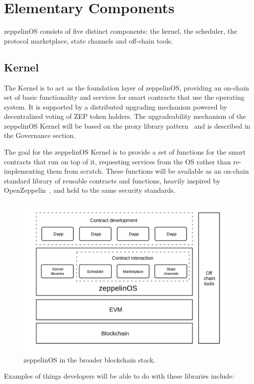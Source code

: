 \documentclass[]{article}
\makeatletter
\DeclareRobustCommand{\_}{%
  \leavevmode\vbox{%
    \hrule\@width.5em
          \@height-.26ex
          \@depth\dimexpr.26ex+.28pt\relax}}
\makeatother
\begin{document}
\section{Elementary Components}

zeppelinOS consists of five distinct components: the kernel, the
scheduler, the protocol marketplace, state channels and off-chain
tools.

\subsection{Kernel}

The Kernel is to act as the foundation layer of zeppelinOS, providing
an on-chain set of basic functionality and services for smart
contracts that use the operating system. It is supported by a distributed
upgrading mechanism powered by decentralized voting of ZEP token
holders. The upgradeability mechanism of the zeppelinOS Kernel will be
based on the proxy library pattern~\cite{proxylibs} and is described in
the Governance section.

The goal for the zeppelinOS Kernel is to provide a set of functions for
the smart contracts that run on top of it, requesting services from the
OS rather than re-implementing them from scratch. These functions will
be available as an on-chain standard library of reusable contracts and
functions, heavily inspired by OpenZeppelin~\cite{openzeppelin}, and held to the
same security standards.

\begin{figure}
  \centering
  \includegraphics[width=0.65\linewidth]{images/image6}
  \caption{zeppelinOS in the broader blockchain stack.}
\end{figure}

Examples of things developers will be able to do with these libraries
include:
\end{document}
